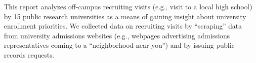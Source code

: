 \documentclass[twoside]{article}
\begin{document}

This report analyzes off-campus recruiting visits (e.g., visit to a local high school) by 15 public research universities as a means of gaining insight about university enrollment priorities. We collected data on recruiting visits by “scraping” data from university admissions websites (e.g., webpages advertising admissions representatives coming to a ``neighborhood near you'') and by issuing public records requests.
\end{document}
